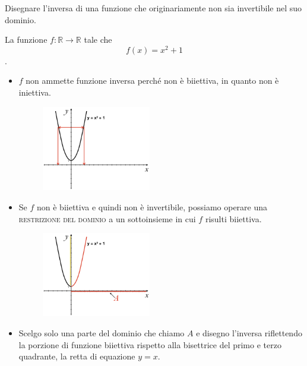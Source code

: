 \begin{esempio} Disegnare l'inversa di una funzione che originariamente non 
sia invertibile nel suo dominio. 

La funzione \(f:\mathbb{R}\to\mathbb{R}\) tale che \[f(x)=x^2+1\].
\begin{itemize}
  \item \(f\) non ammette funzione inversa perché non è biiettiva, in 
quanto non è iniettiva.
  \begin{figure}[htpb!]
  \centering
  
\includegraphics[width=0.45\textwidth]{img/funz_14a.png} %
  
  
  \end{figure}
  \item Se \(f\) non è biiettiva e quindi non è invertibile, possiamo 
operare una \textsc{restrizione del dominio} a un sottoinsieme in cui \(f\) 
risulti biiettiva.
  \begin{figure}[htpb!]
  \centering
  
  
\includegraphics[width=0.45\textwidth]{img/funz_14b.png} %
  
  \end{figure}
  \item Scelgo solo una parte del dominio che chiamo \(A\) e disegno 
l'inversa riflettendo la porzione di funzione biiettiva rispetto alla 
bisettrice del primo e terzo quadrante, la retta di equazione \(y=x\).
  \begin{figure}[htpb!]
  \centering
  

\end{figure}
\end{itemize}
\end{esempio}
